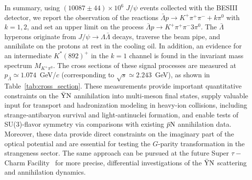 \documentclass[prd,aps,reprint,noeprint,superscriptaddress,amsmath, amssymb]{revtex4-1}
\begin{document}
In summary, using $(10087 \pm 44)\times 10^6$ $J/\psi$ events collected with the BESIII detector,
we report the observation of the reactions $\bar{\Lambda}p \to K^+\pi^+\pi^- + k\pi^0$ with $k=1,2$,
and set an upper limit on the process $\bar{\Lambda}p \to K^+\pi^+\pi^- 3\pi^0$.
The $\bar{\Lambda}$ hyperons originate from $J/\psi \to \Lambda\bar{\Lambda}$ decays, traverse the beam pipe, and annihilate on the protons at rest in the cooling oil.
In addition, an evidence for an intermediate $K^{*}(892)^{+}$ in the $k=1$ channel is found in the invariant mass spectrum $M_{K^+\pi^0}$.
The cross sections of these signal processes are measured at $p_{\bar{\Lambda}}\simeq 1.074$~GeV/$c$ (corresponding to $\sqrt{s}\simeq2.243$~GeV),
as shown in Table~\ref{tab:cross_section}.
These measurements provide important quantitative constraints on the $\rm \bar{Y}N$ annihilation
into multi-meson final states, supply valuable input for transport and hadronization modeling in heavy-ion collisions,
including strange‑antibaryon survival and light‑antinuclei formation,
and enable tests of SU(3)-flavor symmetry via comparisons with existing $\bar{p} \rm N$ annihilation data.
Moreover, these data provide direct constraints on the imaginary part of the optical potential and
are essential for testing the $G$-parity transformation in the strangeness sector.
The same approach can be pursued at the future Super $\tau-$Charm Facility~\cite{Achasov:2023gey} for more precise,
differential investigations of the $\rm \bar{Y}N$ scattering and annihilation dynamics.






\end{document}
